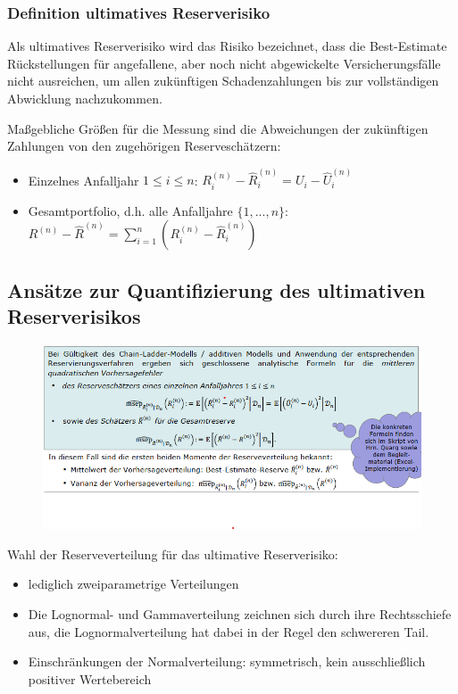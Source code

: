 \documentclass[12pt]{report}
\theoremstyle{dotless}
\theoremstyle{definition}
\begin{document}
\subsubsection{Definition ultimatives Reserverisiko}
Als ultimatives Reserverisiko wird das Risiko bezeichnet, dass die Best-Estimate
Rückstellungen für angefallene, aber noch nicht abgewickelte Versicherungsfälle nicht
ausreichen, um allen zukünftigen Schadenzahlungen bis zur vollständigen Abwicklung
nachzukommen.

Maßgebliche Größen für die Messung sind die Abweichungen der zukünftigen Zahlungen von den zugehörigen Reserveschätzern:
\begin{itemize}
\item Einzelnes Anfalljahr $1 \leq i \leq n$: $R^{(n)}_i - \hat{R}^{(n)}_i= U_i - \hat{U}^{(n)}_i$
\item Gesamtportfolio, d.h. alle Anfalljahre $\{1,...,n\}$: $R^{(n)} - \hat{R}^{(n)} = \sum^n_{i=1} (R^{(n)}_i - \hat{R}^{(n)}_i)$
\end{itemize}


\subsection{Ansätze zur Quantifizierung des ultimativen Reserverisikos}

\begin{figure}[ht]
	\centering
	\includegraphics[width= \textwidth]{Bilder/Schaetzer.png}
\end{figure}

Wahl der Reserveverteilung für das ultimative Reserverisiko:
\begin{itemize}
\item lediglich zweiparametrige Verteilungen 
\item  Die Lognormal- und Gammaverteilung zeichnen sich durch ihre Rechtsschiefe aus, die Lognormalverteilung hat dabei in der Regel den schwereren Tail.
\item Einschränkungen der Normalverteilung: symmetrisch, kein ausschließlich positiver
Wertebereich
\end{itemize}
\end{document}
